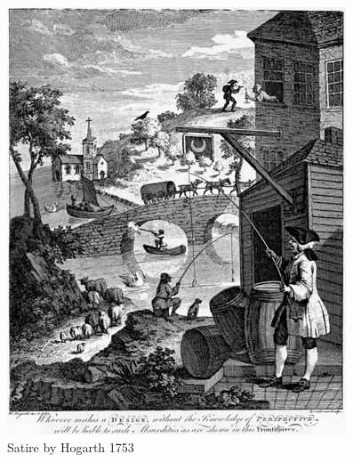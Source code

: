 \begin{figure}[h]
\centering
\includegraphics[width=\columnwidth]{img/hogarth_satire.jpg}
\caption{Satire by Hogarth 1753}%
\label{fig:hogarth_satire}
\end{figure}

